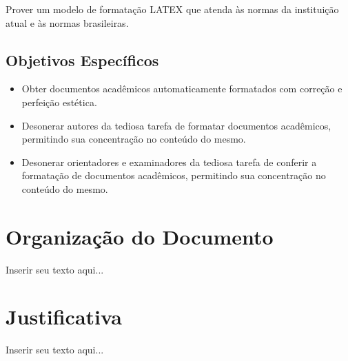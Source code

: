 Prover um modelo de formatação LATEX que atenda às normas da instituição atual e às normas brasileiras.

\subsection{Objetivos Específicos}
\label{subsec:objetivosEspecificos}

\begin{itemize}
	\item Obter documentos acadêmicos automaticamente formatados com correção e perfeição estética.
	\item Desonerar autores da tediosa tarefa de formatar documentos acadêmicos, permitindo sua concentração no conteúdo do mesmo.
	\item Desonerar orientadores e examinadores da tediosa tarefa de conferir a formatação de documentos acadêmicos, permitindo sua concentração no conteúdo do mesmo.
\end{itemize}


\section{Organização do Documento}
\label{sec:organizacaoDocumento}

Inserir seu texto aqui...

\section{Justificativa}
\label{sec:justificativa}

Inserir seu texto aqui...
